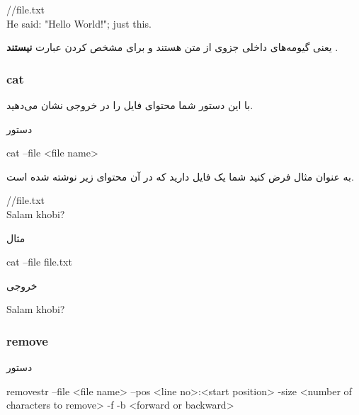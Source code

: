 \documentclass[]{article}
\begin{document}
\begin{latin}
{\mymono
//file.txt\\
He said: "Hello World!"; just this.\\}
\end{latin}
یعنی گیومه‌های داخلی جزوی از متن هستند و برای مشخص کردن عبارت \textbf{نیستند }.

\subsubsection*{{\titr cat}}

با این دستور شما محتوای فایل را در خروجی نشان می‌دهید.\\

\begin{mybox}[colback=yellow]{دستور}
	\begin{latin}	
		cat --file <file name>
	\end{latin}
\end{mybox}

به عنوان مثال فرض کنید شما یک فایل دارید که در آن محتوای زیر نوشته شده است.

\begin{latin}
{\mymono
//file.txt\\
Salam khobi?\\}
\end{latin}

\begin{mybox}[colback=yellow]{مثال}
	\begin{latin}	
		cat --file file.txt
	\end{latin}
\end{mybox}

\begin{mybox}[colback=yellow]{خروجی}
	\begin{latin}	
		Salam khobi?
	\end{latin}
\end{mybox}




\subsubsection*{{\titr remove}}

\begin{mybox}[colback=yellow]{دستور}
	\begin{latin}	
		removestr --file <file name> --pos <line no>:<start position> -size <number of characters to remove> -f -b <forward or backward>
	\end{latin}
\end{mybox}
\end{document}
